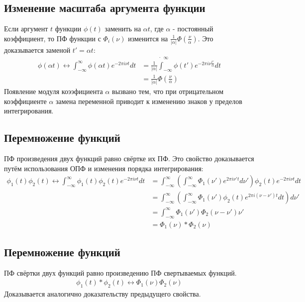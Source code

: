 \documentclass[a4paper, 12pt]{report}
\begin{document}
	\subsection{Изменение масштаба аргумента функции}
	Если аргумент $t$ функции $\phi(t)$ заменить на $\alpha t$, где $\alpha$ - постоянный коэффициент, то ПФ функции с $\Phi_i(\nu)$ изменится на $\frac{1}{|\alpha|} \Phi\left(\frac{\nu}{\alpha}\right)$. Это доказывается заменой $t' = \alpha t$:
	\[
        		\begin{aligned}
            		\phi(\alpha t) \leftrightarrow \int_{-\infty}^{\infty} \phi(\alpha t) e^{-2\pi i\nu t} dt
            		&= \frac{1}{|\alpha|} \dot \int_{-\infty}^{\infty} \phi(t') e^{-2\pi i\nu \frac{t'}{\alpha}} dt \\
			&= \frac{1}{|\alpha|} \Phi\left(\frac{\nu}{\alpha}\right)
        		\end{aligned}
    	\]
	Появление модуля коээфициента $\alpha$ вызвано тем, что при отрицательном коэффициенте $\alpha$ замена переменной приводит к изменению знаков у пределов интегрирования.

	\subsection{Перемножение функций}
	ПФ произведения двух функций равно свёртке их ПФ. Это свойство доказывается путём использования ОПФ и изменения порядка интегрирования:
	\[
        		\begin{aligned}
            		\phi_1(t) \phi_2(t) \leftrightarrow \int_{-\infty}^{\infty}\phi_1(t) \phi_2(t) e^{-2\pi i\nu t} dt
            		&= \int_{-\infty}^{\infty} \left( \int_{-\infty}^{\infty} \Phi_1(\nu') e^{2\pi i \nu' t} d\nu' \right) \phi_2(t) e^{-2\pi i\nu t} dt \\
           		&= \int_{-\infty}^{\infty} \left( \int_{-\infty}^{\infty} \Phi_1(\nu') \phi_2(t)  e^{2\pi i (\nu - \nu')t} dt \right) d\nu' \\
            		&= \int_{-\infty}^{\infty} \Phi_1(\nu') \Phi_2(\nu - \nu') \nu' \\
			&= \Phi_1(\nu) * \Phi_2(\nu)
        		\end{aligned}
    	\]

	\subsection{Перемножение функций}
	ПФ свёртки двух функций равно произведению ПФ свертываемых функций.
	\[
        		\begin{aligned}
            		 \phi_1(t) * \phi_2(t) \leftrightarrow \Phi_1(\nu) \Phi_2(\nu)
        		\end{aligned}
    	\]
	Доказывается аналогично доказательству предыдущего свойства.
	
\end{document}
